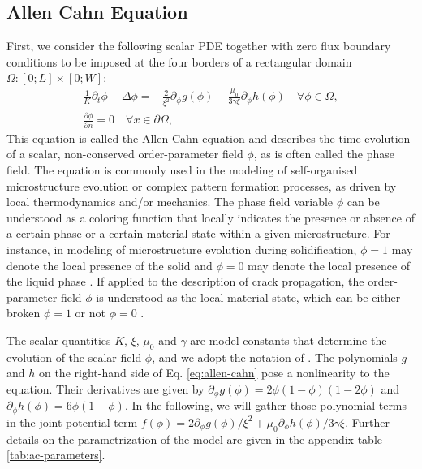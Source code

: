 \documentclass[asi,article,submit,moreauthors]{Definitions/mdpi}
\begin{document}
\subsection{Allen Cahn Equation}\label{Examples-Allen-Cahn-Equation}

First, we consider the following scalar PDE together with zero flux boundary conditions to be imposed at the four borders of a rectangular domain $\Omega: [0;L]\times[0;W]$:
\begin{align}
    \frac{1}{K} {\partial_t\phi} - \Delta \phi  = -\frac{2}{\xi^2}{\partial_\phi g(\phi)}-\frac{\mu_{0}}{3\gamma\xi}{\partial_\phi h(\phi)} \quad \forall \phi  \in \Omega, \label{eq:allen-cahn} \\
    \frac{\partial \phi}{\partial n}  = 0 \quad \forall x \in \partial \Omega \label{eq:ac-neumann},
\end{align}
This equation is called the Allen Cahn equation and describes the time-evolution of a scalar, non-conserved order-parameter field $\phi$, as is often called the phase field. 
The equation is commonly used in the modeling of self-organised microstructure evolution or complex pattern formation processes, as driven by local thermodynamics and/or mechanics. 
The phase field variable $\phi$ can be understood as a coloring function that locally indicates the presence or absence of a certain phase or a certain material state within a given microstructure. 
For instance, in modeling of microstructure evolution during solidification, $\phi = 1$ may denote the local presence of the solid and $\phi = 0$ may denote the local presence of the liquid phase \cite{fleckSharpPhasefieldModeling2023,fleckFrictionlessMotionDiffuse2022}.
If applied to the description of crack propagation, the order-parameter field $\phi$ is understood as the local material state, which can be either broken $\phi =1$ or not $\phi = 0$ \cite{PilipenkoFleckEmmerich2011,FleckPilipenSpatsch122010}.

The scalar quantities $K$, $\xi$, $\mu_0$ and $\gamma$ are model constants that determine the evolution of the scalar field $\phi$, and we adopt the notation of \cite{FleckFedermannPogorelov2018}. 
The polynomials $g$ and $h$ on the right-hand side of Eq. \ref{eq:allen-cahn} pose a nonlinearity to the equation. 
Their derivatives are given by $\partial_\phi g(\phi) = 2 \phi (1 - \phi) (1 - 2\phi)$ and $\partial_\phi h(\phi) = 6 \phi (1 - \phi)$. 
In the following, we will gather those polynomial terms in the joint potential term $f(\phi)= {2}{\partial_\phi g(\phi)}/{\xi^2}+{\mu_{0}}{\partial_\phi h(\phi)}/{3\gamma\xi}$.
Further details on the parametrization of the model are given in the appendix table \ref{tab:ac-parameters}.
\end{document}
